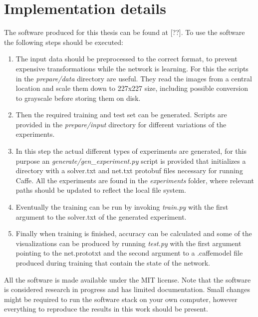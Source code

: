 %
\chapter{Implementation details}
\label{app:implementation_details}

The software produced for this thesis can be found at [??]. To use the software the following steps should be executed:
\begin{enumerate}
\item The input data should be preprocessed to the correct format, to prevent expensive transformations while the network is learning. For this the scripts in the \textit{prepare/data} directory are useful. They read the images from a central location and scale them down to 227x227 size, including possible conversion to grayscale before storing them on disk.
\item Then the required training and test set can be generated. Scripts are provided in the \textit{prepare/input} directory for different variations of the experiments.
\item In this step the actual different types of experiments are generated, for this purpose an \textit{generate/gen\_experiment.py} script is provided that initializes a directory with a solver.txt and net.txt protobuf files necessary for running Caffe. All the experiments are found in the \textit{experiments} folder, where relevant paths should be updated to reflect the local file system.
\item Eventually the training can be run by invoking \textit{train.py} with the first argument to the solver.txt of the generated experiment. 
\item Finally when training is finished, accuracy can be calculated and some of the visualizations can be produced by running \textit{test.py} with the first argument pointing to the net.prototxt and the second argument to a .caffemodel file produced during training that contain the state of the network.
\end{enumerate}
All the software is made available under the MIT license. Note that the software is considered research in progress and has limited documentation. Small changes might be required to run the software stack on your own computer, however everything to reproduce the results in this work should be present.
